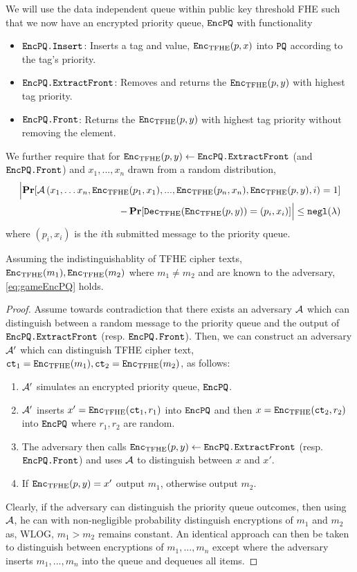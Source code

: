 We will use the data independent queue within public key threshold FHE such that we now have an encrypted priority queue, $\texttt{EncPQ}$
with functionality
\begin{itemize}
	\item $\texttt{EncPQ.Insert}$: Inserts a tag and value, $\texttt{Enc}_{\mathrm{TFHE}}(p, x)$ into $\texttt{PQ}$ according to the tag's priority.
	\item $\texttt{EncPQ.ExtractFront}$: Removes and returns the $\texttt{Enc}_{\mathrm{TFHE}}(p, y)$ with highest tag priority.
	\item $\texttt{EncPQ.Front}$: Returns the $\texttt{Enc}_{\mathrm{TFHE}}(p, y)$ with highest tag priority without removing the element.
\end{itemize}

We further require that for $\texttt{Enc}_{\mathrm{TFHE}}(p, y) \gets \texttt{EncPQ.ExtractFront}$ (and $\texttt{EncPQ.Front}$) and $x_1, ..., x_n$ drawn from a random distribution,
\begin{align}
	\label{eq:gameEncPQ}
	\Bigl\lvert \operatorname*{\mathbf{Pr}}[\mathcal{A}\left(x_1, \dots x_n, \texttt{Enc}_{\mathrm{TFHE}}(p_1, x_1), ..., \texttt{Enc}_{\mathrm{TFHE}}(p_n, x_n), \texttt{Enc}_{\mathrm{TFHE}}(p, y), i\right) = 1] \\
		- \operatorname*{\mathbf{Pr}}[\texttt{Dec}_{\mathrm{TFHE}}(\texttt{Enc}_{\mathrm{TFHE}}(p, y)) = (p_i, x_i)] \Bigr\rvert \leq \texttt{negl}(\lambda) \notag
\end{align}
where $(p_i, x_i)$ is the $i$th submitted message to the priority queue.

\begin{lemma}
	Assuming the indistinguishablity of TFHE cipher texts, $\texttt{Enc}_{\mathrm{TFHE}}(m_1), \texttt{Enc}_{\mathrm{TFHE}}(m_2)$ where $m_1 \neq m_2$ and are known to the adversary, \cref{eq:gameEncPQ} holds.

	\begin{proof}
		Assume towards contradiction that there exists an adversary $\mathcal{A}$ which can distinguish between a random 
		message to the priority queue and the output of $\texttt{EncPQ.ExtractFront}$ (resp. $\texttt{EncPQ.Front}$).
		Then, we can construct an adversary $\mathcal{A}'$ which can distinguish TFHE cipher text, $\texttt{ct}_1 = \texttt{Enc}_{\mathrm{TFHE}}(m_1), \texttt{ct}_2 = \texttt{Enc}_{\mathrm{TFHE}}(m_2)$, as follows:
		\begin{enumerate}
			\item $\mathcal{A}'$ simulates an encrypted priority queue, $\texttt{EncPQ}$.
			\item $\mathcal{A}'$ inserts $x' = \texttt{Enc}_{\mathrm{TFHE}}(\texttt{ct}_1, r_1)$ into $\texttt{EncPQ}$ and then $x = \texttt{Enc}_{\mathrm{TFHE}}(\texttt{ct}_2, r_2)$ into $\texttt{EncPQ}$
			where $r_1, r_2$ are random.
			\item The adversary then calls $\texttt{Enc}_{\mathrm{TFHE}}(p, y) \gets \texttt{EncPQ.ExtractFront}$ (resp. $\texttt{EncPQ.Front}$) and uses $\mathcal{A}$ to distinguish between $x$ and $x'$.
			\item If $\texttt{Enc}_{\mathrm{TFHE}}(p, y) = x'$ output $m_1$, otherwise output $m_2$.
		\end{enumerate}
		Clearly, if the adversary can distinguish the priority queue outcomes, then using $\mathcal{A}$, he can with non-negligible probability
		distinguish encryptions of $m_1$ and $m_2$ as, WLOG, $m_1 > m_2$ remains constant. An identical approach can then be taken
		to distinguish between encryptions of $m_1, ..., m_n$ except where the adversary inserts $m_1, ..., m_n$ into the queue and dequeues all items.
	\end{proof}
\end{lemma}


